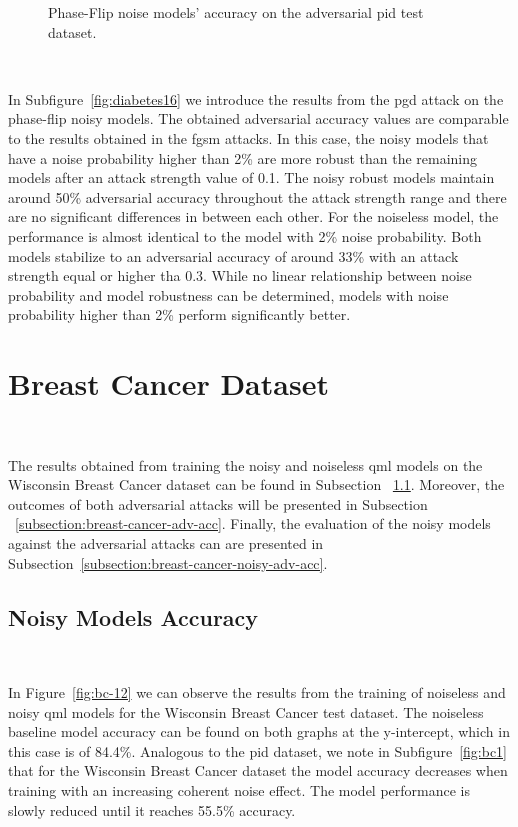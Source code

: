 \begin{figure}[!h]
  \caption{Phase-Flip noise models' accuracy on the adversarial \ac{pid} test dataset.}
  \label{fig:diabetes-1516}
\end{figure} \

In Subfigure~\ref{fig:diabetes16} we introduce the results from the \ac{pgd}
attack on the phase-flip noisy models. The obtained adversarial accuracy
values are comparable to the results obtained in the \ac{fgsm} attacks.
In this case, the noisy models that have a noise probability higher than
2\% are more robust than the remaining models after an attack
strength value of 0.1. The noisy robust models maintain around 50\%
adversarial accuracy throughout the attack strength range and there
are no significant differences in between each other. For the noiseless
model, the performance is almost identical to the model with 2\% noise
probability. Both models stabilize to an adversarial accuracy of around
33\% with an attack strength equal or higher tha 0.3. While no linear
relationship between noise probability and model robustness can be
determined, models with noise probability higher than 2\% perform
significantly better. \

\section{Breast Cancer Dataset}\label{section:breast-cancer-eval} \

The results obtained from training the noisy and noiseless
\ac{qml} models on the Wisconsin Breast Cancer dataset can be found in Subsection
~\ref{subsection:breast-cancer-noisy-acc}. Moreover, the outcomes
of both adversarial attacks will be presented in Subsection
~\ref{subsection:breast-cancer-adv-acc}. Finally, the evaluation
of the noisy models against the adversarial attacks can
are presented in Subsection~\ref{subsection:breast-cancer-noisy-adv-acc}. \

\subsection{Noisy Models Accuracy}\label{subsection:breast-cancer-noisy-acc} \

In Figure~\ref{fig:bc-12} we can observe the results
from the training of noiseless and noisy \ac{qml} models
for the Wisconsin Breast Cancer test dataset. The noiseless baseline model accuracy
can be found on both graphs at the y-intercept, which in
this case is of 84.4\%. Analogous to the \ac{pid} dataset, we note
in Subfigure~\ref{fig:bc1} that for the Wisconsin Breast Cancer
dataset the model accuracy decreases when training
with an increasing coherent noise effect. The model performance
is slowly reduced until it reaches 55.5\% accuracy. \


